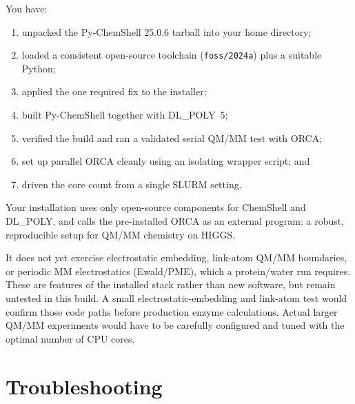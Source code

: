 \documentclass[12pt,a4paper]{article}
\begin{document}
You have:
\begin{enumerate}
  \item unpacked the Py-ChemShell 25.0.6 tarball into your home directory;
  \item loaded a consistent open-source toolchain (\texttt{foss/2024a}) plus a
        suitable Python;
  \item applied the one required fix to the installer;
  \item built Py-ChemShell together with DL\_POLY~5;
  \item verified the build and ran a validated serial QM/MM test with ORCA;
  \item set up parallel ORCA cleanly using an isolating wrapper script; and
  \item driven the core count from a single SLURM setting.
\end{enumerate}

Your installation uses only open-source components for ChemShell and DL\_POLY, and
calls the pre-installed ORCA as an external program: a robust, reproducible
setup for QM/MM chemistry on HIGGS.

\phantom{i} %

It does not yet exercise electrostatic embedding, link-atom QM/MM boundaries, or periodic MM electrostatics (Ewald/PME), which a protein/water run requires. These are features of the installed stack rather than new software, but remain untested in this build. A small electrostatic-embedding and link-atom test would confirm those code paths before production enzyme calculations. Actual larger QM/MM experiments would have to be carefully configured and tuned with the optimal number of CPU cores.

\newpage

\appendix
\section{Troubleshooting}

\phantom{i} %
\end{document}
